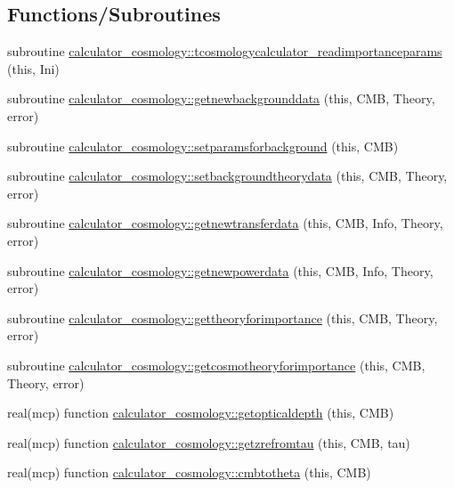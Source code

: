 \subsection*{Functions/\+Subroutines}
\begin{DoxyCompactItemize}
\item 
subroutine \mbox{\hyperlink{namespacecalculator__cosmology_a8df979f2a96e1c2b9624e105619464c2}{calculator\+\_\+cosmology\+::tcosmologycalculator\+\_\+readimportanceparams}} (this, Ini)
\item 
subroutine \mbox{\hyperlink{namespacecalculator__cosmology_a9b28cf77b06f92cdf1260e0a1f8a72c1}{calculator\+\_\+cosmology\+::getnewbackgrounddata}} (this, C\+MB, Theory, error)
\item 
subroutine \mbox{\hyperlink{namespacecalculator__cosmology_aabddd5a422eef22f8d13c1df292cc749}{calculator\+\_\+cosmology\+::setparamsforbackground}} (this, C\+MB)
\item 
subroutine \mbox{\hyperlink{namespacecalculator__cosmology_a8f03c8f23e837020c788389a8ffb4be3}{calculator\+\_\+cosmology\+::setbackgroundtheorydata}} (this, C\+MB, Theory, error)
\item 
subroutine \mbox{\hyperlink{namespacecalculator__cosmology_a96e555c628aadff1d707242e238d09f8}{calculator\+\_\+cosmology\+::getnewtransferdata}} (this, C\+MB, Info, Theory, error)
\item 
subroutine \mbox{\hyperlink{namespacecalculator__cosmology_a456c87c218951defda2a9bcf4f23abb8}{calculator\+\_\+cosmology\+::getnewpowerdata}} (this, C\+MB, Info, Theory, error)
\item 
subroutine \mbox{\hyperlink{namespacecalculator__cosmology_a98a6aa3eeac24c242c935e0740b470d8}{calculator\+\_\+cosmology\+::gettheoryforimportance}} (this, C\+MB, Theory, error)
\item 
subroutine \mbox{\hyperlink{namespacecalculator__cosmology_a520171f2409b797206b45a9b2f25ac22}{calculator\+\_\+cosmology\+::getcosmotheoryforimportance}} (this, C\+MB, Theory, error)
\item 
real(mcp) function \mbox{\hyperlink{namespacecalculator__cosmology_a9907b8c61d20213e8026443a5043530f}{calculator\+\_\+cosmology\+::getopticaldepth}} (this, C\+MB)
\item 
real(mcp) function \mbox{\hyperlink{namespacecalculator__cosmology_a3f26a3af3732dbfea7715d565b44a385}{calculator\+\_\+cosmology\+::getzrefromtau}} (this, C\+MB, tau)
\item 
real(mcp) function \mbox{\hyperlink{namespacecalculator__cosmology_a6178a84302763ba24c2283bf6e8e5b2b}{calculator\+\_\+cosmology\+::cmbtotheta}} (this, C\+MB)

\end{DoxyCompactItemize}
